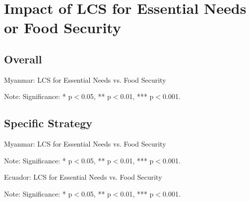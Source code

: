 \documentclass[11pt,harvard]{article}
\begin{document}
	\pagebreak
	
	\section{Impact of LCS for Essential Needs or Food Security}
	
	\subsection{Overall}
	\begin{table}[htbp]
		\centering
		\begin{adjustbox}{max width=\textwidth}
			\begin{threeparttable}
				\caption{Myanmar: LCS for Essential Needs vs. Food Security}
				\scriptsize
				 
				\label{tab:LCS_F2F_EN_FS_All_Country}
				\begin{tablenotes}
					\item Note: Significance: * p$<$0.05, ** p$<$0.01, *** p$<$0.001. 
				\end{tablenotes}
			\end{threeparttable}
		\end{adjustbox}
	\end{table}
	\pagebreak
	
	\subsection{Specific Strategy}
	\begin{table}[htbp]
		\centering
		\begin{adjustbox}{max width=\textwidth}
			\begin{threeparttable}
				\caption{Myanmar: LCS for Essential Needs vs. Food Security}
				\scriptsize
				 
				\label{tab:LCS_F2F_EN_FS_Myanmar}
				\begin{tablenotes}
					\item Note: Significance: * p$<$0.05, ** p$<$0.01, *** p$<$0.001. 
				\end{tablenotes}
			\end{threeparttable}
		\end{adjustbox}
	\end{table}
	
	\begin{table}[htbp]
		\centering
		\begin{adjustbox}{max width=\textwidth}
			\begin{threeparttable}
				\caption{Ecuador: LCS for Essential Needs vs. Food Security}
				\scriptsize
				 
				\label{tab:LCS_F2F_EN_FS_Ecuador}
				\begin{tablenotes}
					\item Note: Significance: * p$<$0.05, ** p$<$0.01, *** p$<$0.001. 
				\end{tablenotes}
			\end{threeparttable}
		\end{adjustbox}
	\end{table}
	
\end{document}
